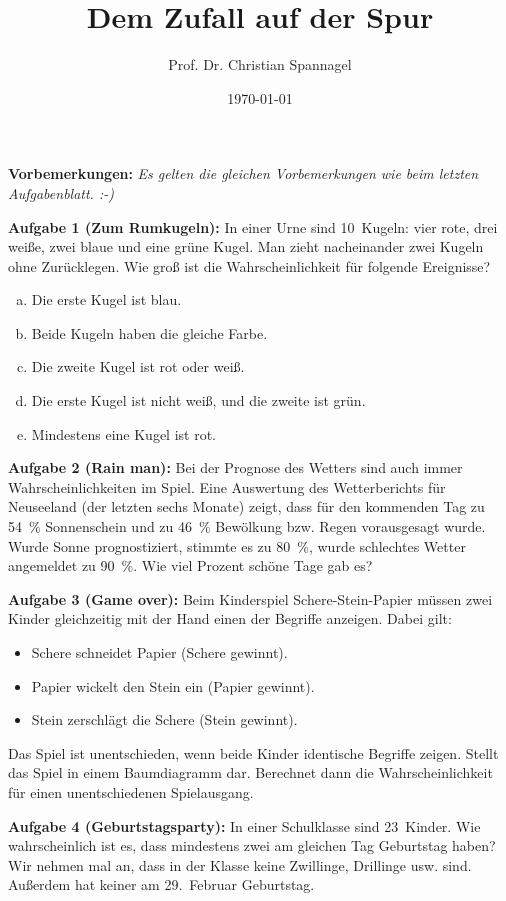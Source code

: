 \documentclass{../cssheet}
\title{Dem Zufall auf der Spur}
\author{Prof. Dr. Christian Spannagel}
\date{\today}
\begin{document}
\printtitle

\vspace*{10mm}

\textbf{Vorbemerkungen:} 
\emph{Es gelten die gleichen Vorbemerkungen wie beim letzten Aufgabenblatt. :-)}

\textbf{Aufgabe 1 (Zum Rumkugeln):}  In einer Urne sind 10~Kugeln:  vier	rote, drei weiße, zwei blaue und eine grüne Kugel. Man zieht nacheinander zwei Kugeln ohne Zurücklegen. Wie groß ist die Wahrscheinlichkeit für folgende Ereignisse?

\begin{enumerate}[a)]
\item Die erste Kugel ist blau.
\item Beide Kugeln haben die gleiche Farbe.
\item Die zweite Kugel ist rot oder weiß.
\item Die erste Kugel ist nicht weiß, und die zweite ist grün.
\item Mindestens eine Kugel ist rot.
\end{enumerate}


\textbf{Aufgabe 2 (Rain man):} Bei der Prognose des Wetters sind auch immer Wahrscheinlichkeiten im Spiel. Eine Auswertung des Wetterberichts für Neuseeland (der letzten sechs Monate) zeigt, dass für den kommenden Tag zu 54~\% Sonnenschein und zu 46~\% Bewölkung bzw. Regen vorausgesagt wurde. Wurde Sonne prognostiziert, stimmte es zu 80~\%, wurde schlechtes Wetter angemeldet zu 90~\%. Wie viel Prozent schöne Tage gab es?	 

\textbf{Aufgabe 3 (Game over):} Beim Kinderspiel \glqq{}Schere-Stein-Papier\grqq{} müssen zwei Kinder gleichzeitig mit der Hand einen der Begriffe anzeigen. Dabei gilt:
\begin{itemize}
\item Schere schneidet Papier (Schere gewinnt).
\item Papier wickelt den Stein ein (Papier gewinnt).
\item Stein zerschlägt die Schere (Stein gewinnt).
\end{itemize}
Das Spiel ist unentschieden, wenn beide Kinder identische Begriffe zeigen. Stellt das Spiel in einem Baumdiagramm dar. Berechnet dann die Wahrscheinlichkeit für einen unentschiedenen Spielausgang.

\textbf{Aufgabe 4 (Geburtstagsparty):} In einer Schulklasse sind 23~Kinder. Wie wahrscheinlich ist es, dass mindestens zwei am gleichen Tag Geburtstag haben? Wir nehmen mal an, dass in der Klasse keine Zwillinge, Drillinge usw. sind. Außerdem hat keiner am 29.~Februar Geburtstag.  
\end{document}

